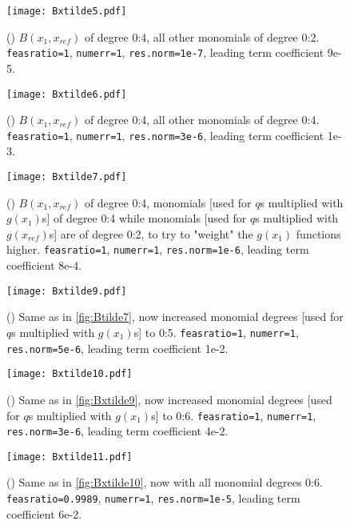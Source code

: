 \begin{figure}[h]
\centering\texttt{[image: Bxtilde5.pdf]}
\caption{() $B(x_1,x_{ref})$ of degree 0:4, all other monomials of degree 0:2. \texttt{feasratio=1}, \texttt{numerr=1}, \texttt{res.norm=1e-7}, leading term coefficient 9e-5.}
\label{fig:Bxtilde5}
\end{figure}

\begin{figure}[h]
\centering\texttt{[image: Bxtilde6.pdf]}
\caption{() $B(x_1,x_{ref})$ of degree 0:4, all other monomials of degree 0:4. \texttt{feasratio=1}, \texttt{numerr=1}, \texttt{res.norm=3e-6}, leading term coefficient 1e-3.}
\label{fig:Bxtilde6}
\end{figure}

\begin{figure}[h]
\centering\texttt{[image: Bxtilde7.pdf]}
\caption{() $B(x_1,x_{ref})$ of degree 0:4,  monomials [used for $q$s multiplied with $g(x_1)$s] of degree 0:4 while monomials [used for $q$s multiplied with $g(x_{ref})$s] are of degree 0:2, to try to "weight" the $g(x_1)$ functions higher. \texttt{feasratio=1}, \texttt{numerr=1}, \texttt{res.norm=1e-6}, leading term coefficient 8e-4.}
\label{fig:Bxtilde7}
\end{figure}

\begin{figure}[H]
\centering\texttt{[image: Bxtilde9.pdf]}
\caption{() Same as in \autoref{fig:Btilde7}, now increased monomial degrees [used for $q$s multiplied with $g(x_1)$s] to 0:5. \texttt{feasratio=1}, \texttt{numerr=1}, \texttt{res.norm=5e-6}, leading term coefficient 1e-2.}
\label{fig:Bxtilde9}
\end{figure}

\begin{figure}[H]
\centering\texttt{[image: Bxtilde10.pdf]}
	\caption{() Same as in \autoref{fig:Bxtilde9}, now increased monomial degrees [used for $q$s multiplied with $g(x_1)$s] to 0:6. \texttt{feasratio=1}, \texttt{numerr=1}, \texttt{res.norm=3e-6}, leading term coefficient 4e-2.}
	\label{fig:Bxtilde10}
\end{figure}

\begin{figure}[H]
	\centering\texttt{[image: Bxtilde11.pdf]}
	\caption{() Same as in \autoref{fig:Bxtilde10}, now with all monomial degrees 0:6. \texttt{feasratio=0.9989}, \texttt{numerr=1}, \texttt{res.norm=1e-5}, leading term coefficient 6e-2.}
	\label{fig:Bxtilde11}
\end{figure}

